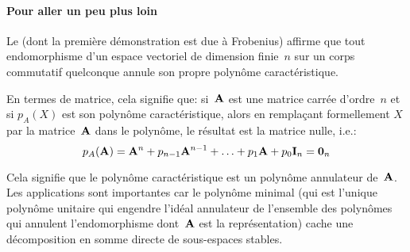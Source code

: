 \medskip
{}
\paragraph{Pour aller un peu plus loin}
Le 
(dont la première démonstration est due à Frobenius)
affirme que tout endomorphisme d'un espace vectoriel de dimension finie~$n$ sur un corps commutatif quelconque
annule son propre polynôme caractéristique.

En termes de matrice, cela signifie que: si~$\MM{A}$ est une matrice carrée d'ordre~$n$ et si
$p_A(X)$ est son polynôme caractéristique, alors en remplaçant formellement
$X$ par la matrice~$\MM{A}$ dans le polynôme, le résultat est la matrice nulle, i.e.:
\begin{equation}p_A(\MM{A})= \MM{A}^n + p_{n-1}\MM{A}^{n-1} + \ldots + p_1 \MM{A} + p_0 \MM{I}_n = \MM{0}_n \end{equation}

Cela signifie que le polynôme caractéristique est un
polynôme annulateur de~$\MM{A}$.
Les applications sont importantes car le polynôme minimal (qui est l'unique polynôme unitaire qui
engendre l'idéal annulateur de l'ensemble des polynômes qui annulent l'endomorphisme dont~$\MM{A}$
est la représentation) cache une décomposition en somme directe de sous-espaces stables.











\medskip
